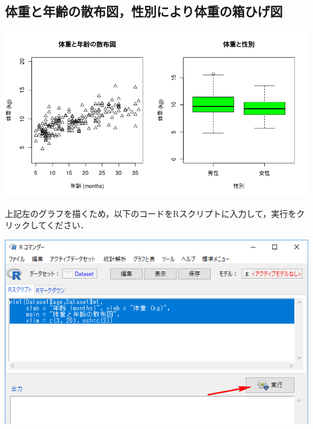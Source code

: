 \documentclass[11pt,]{problemset}
\newenvironment{Shaded}{\begin{snugshade}}{\end{snugshade}}
\newcommand{\DataTypeTok}[1]{\textcolor[rgb]{0.13,0.29,0.53}{#1}}
\newcommand{\DecValTok}[1]{\textcolor[rgb]{0.00,0.00,0.81}{#1}}
\newcommand{\KeywordTok}[1]{\textcolor[rgb]{0.13,0.29,0.53}{\textbf{#1}}}
\newcommand{\NormalTok}[1]{#1}
\newcommand{\OperatorTok}[1]{\textcolor[rgb]{0.81,0.36,0.00}{\textbf{#1}}}
\newcommand{\StringTok}[1]{\textcolor[rgb]{0.31,0.60,0.02}{#1}}
\begin{document}
\subsection{体重と年齢の散布図，性別により体重の箱ひげ図}

\begin{center}\includegraphics[width=0.85\linewidth]{pic/scatter00} \end{center}

上記左のグラフを描くため，以下のコードをRスクリプトに入力して，実行をクリックしてください．

\begin{Shaded}
\end{Shaded}

\bigskip

\begin{center}\includegraphics[width=0.8\linewidth]{pic/scatter01} \end{center}
\end{document}
